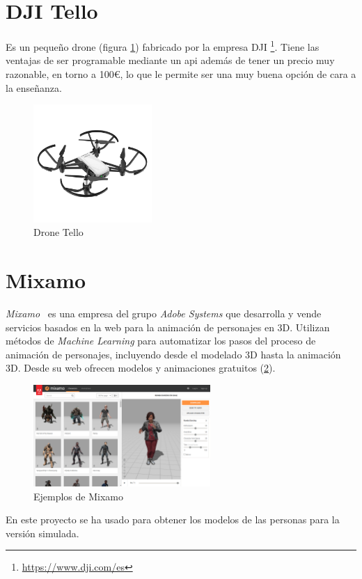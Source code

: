 \section{DJI Tello}
Es un pequeño drone (figura \ref{fig:tello}) fabricado por la empresa DJI \footnote{\url{https://www.dji.com/es}}. Tiene las ventajas de ser programable mediante un \acrshort{api} además de tener un precio muy razonable, en torno a 100€, lo que le permite ser una muy buena opción de cara a la enseñanza.
\begin{figure}[H]
  \begin{center}
    \includegraphics[width=0.4\textwidth]{figures/herramientas/tello.png}
		\caption{Drone Tello}
		\label{fig:tello}
		\end{center}
\end{figure}
\section{Mixamo}
\textit{Mixamo}~\cite{mixamo} es una empresa del grupo \textit{Adobe Systems} que desarrolla y vende servicios basados en la web para la animación de personajes en 3D. Utilizan métodos de \textit{Machine Learning} para automatizar los pasos del proceso de animación de personajes, incluyendo desde el modelado 3D hasta la animación 3D. Desde su web ofrecen modelos y animaciones gratuitos (\ref{fig.mixamo}).
\begin{figure}[H]
  \begin{center}
    \includegraphics[width=0.6\textwidth]{figures/herramientas/mixamo.png}
		\caption{Ejemplos de Mixamo}
		\label{fig.mixamo}
		\end{center}
\end{figure}
En este proyecto se ha usado para obtener los modelos de las personas para la versión simulada.
